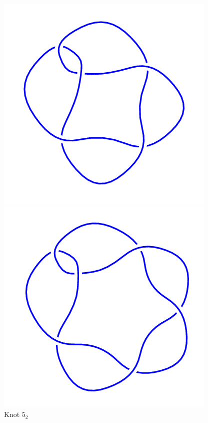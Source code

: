 \documentclass{article}
\begin{document}
\begin{figure}[!htb]
\includegraphics[width=\linewidth]{5_2.png}
\caption{Knot $5_2$}
\endminipage\hfill
{}
\includegraphics[width=\linewidth]{6_1.png}

\end{figure}
\end{document}
